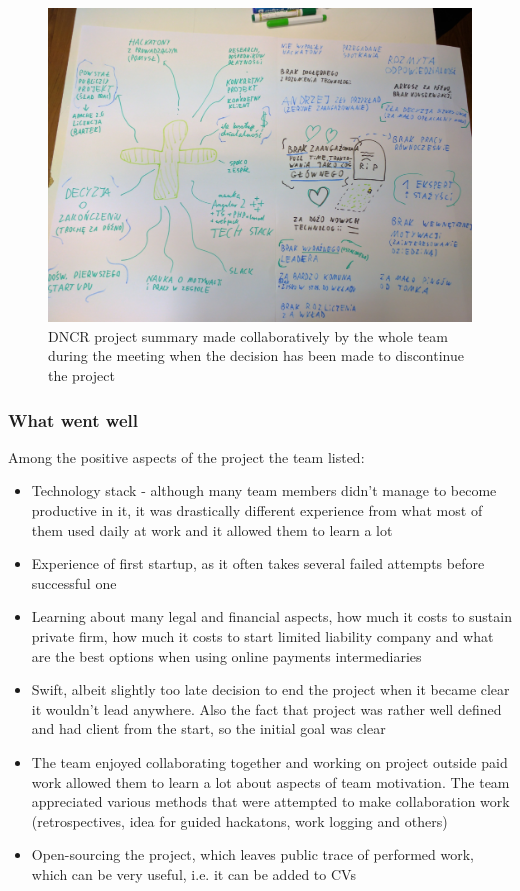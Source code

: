\documentclass{article}
\begin{document}
\begin{figure}[h]
    \includegraphics[width=\textwidth]{dncr-funeral}
    \caption{DNCR project summary made collaboratively by the whole team during the meeting when the decision has been made to discontinue the project}
    \label{fig:dncr-funeral}
\end{figure}
\FloatBarrier

\subsubsection{What went well}

Among the positive aspects of the project the team listed:
\begin{itemize}
\item Technology stack - although many team members didn't manage to become productive in it, it was drastically different experience from what most of them used daily at work and it allowed them to learn a lot
\item Experience of first startup, as it often takes several failed attempts before successful one
\item Learning about many legal and financial aspects, how much it costs to sustain private firm, how much it costs to start limited liability company and what are the best options when using online payments intermediaries
\item Swift, albeit slightly too late decision to end the project when it became clear it wouldn't lead anywhere. Also the fact that project was rather well defined and had client from the start, so the initial goal was clear
\item The team enjoyed collaborating together and working on project outside paid work allowed them to learn a lot about aspects of team motivation. The team appreciated various methods that were attempted to make collaboration work (retrospectives, idea for guided hackatons, work logging and others)
\item Open-sourcing the project, which leaves public trace of performed work, which can be very useful, i.e. it can be added to CVs
\end{itemize}
\end{document}
